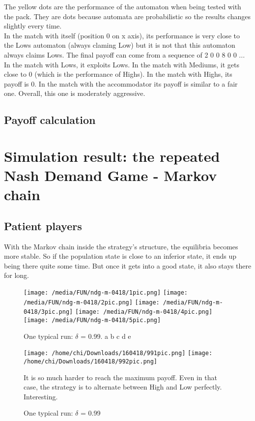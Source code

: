 \documentclass[12.5pt]{report}
\begin{document}
The yellow dots are the performance of the automaton when being tested with the pack. They are dots because automata are probabilistic so the results changes slightly every time.\\

In the match with itself (position 0 on x axis), its performance is very close to the Lows automaton (always claming Low) but it is not that this automaton always claims Lows. The final payoff can come from a sequence of 2 0 0 8 0 0 ... In the match with Lows, it exploits Lows. In the match with Mediums, it gets close to 0 (which is the performance of Highs). In the match with Highs, its payoff is 0. In the match with the accommodator its payoff is similar to a fair one. Overall, this one is moderately aggressive.\\

\section{Payoff calculation}

\chapter{Simulation result: the repeated Nash Demand Game - Markov chain}

\section{Patient players}

With the Markov chain inside the strategy's structure, the equilibria becomes more stable. So if the population state is close to an inferior state, it ends up being there quite some time. But once it gets into a good state, it also stays there for long.


\begin{figure}
\texttt{[image: /media/FUN/ndg-m-0418/1pic.png]}
\texttt{[image: /media/FUN/ndg-m-0418/2pic.png]}
\texttt{[image: /media/FUN/ndg-m-0418/3pic.png]}
\texttt{[image: /media/FUN/ndg-m-0418/4pic.png]}
\texttt{[image: /media/FUN/ndg-m-0418/5pic.png]}

\caption{One typical run: $\delta$ = 0.99. a b c d e}
\end{figure}


\begin{figure}
\texttt{[image: /home/chi/Downloads/160418/991pic.png]}
\texttt{[image: /home/chi/Downloads/160418/992pic.png]}

It is so much harder to reach the maximum payoff. Even in that case, the strategy is to alternate between High and Low perfectly. Interesting.


\caption{One typical run: $\delta$ = 0.99}
\end{figure}
\end{document}
